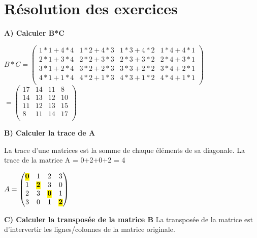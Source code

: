 \newpage

\section{Résolution des exercices}
\vspace{3mm} %
\textbf{A) Calculer B*C}
\vspace{10mm} %

$
B*C =
\begin{pmatrix}
  1*1+4*4 & 1*2+4*3 & 1*3+4*2 & 1*4+4*1 \\
  2*1+3*4 & 2*2+3*3 & 2*3+3*2 & 2*4+3*1 \\
  3*1+2*4 & 3*2+2*3 & 3*3+2*2 & 3*4+2*1 \\
  4*1+1*4 & 4*2+1*3 & 4*3+1*2 & 4*4+1*1 \\
\end{pmatrix}
$
\vspace{5mm} %
$
=
\begin{pmatrix}
  17 & 14 & 11 & 8 \\
  14 & 13 & 12 & 10 \\
  11 & 12 & 13 & 15 \\
  8 & 11 & 14 & 17 \\
\end{pmatrix}
$

\vspace{3mm} %
\textbf{B) Calculer la trace de A}
\vspace{5mm} %

La trace d'une matrices est la somme de chaque éléments de sa diagonale.
La trace de la matrice A = 0+2+0+2 = 4
\vspace{5mm} %

$
A =
\begin{pmatrix}
  \hl{\textbf{0}}  & 1 & 2 & 3 \\
  1 & \hl{\textbf{2}} & 3 & 0 \\
  2 & 3 & \hl{\textbf{0}} & 1 \\
  3 & 0 & 1 & \hl{\textbf{2}} \\
\end{pmatrix}
$

\vspace{6mm} %
\textbf{C) Calculer la transposée de la matrice B}
\vspace{4mm} %
La transposée de la matrice est d'intervertir les lignes/colonnes de la matrice originale.

